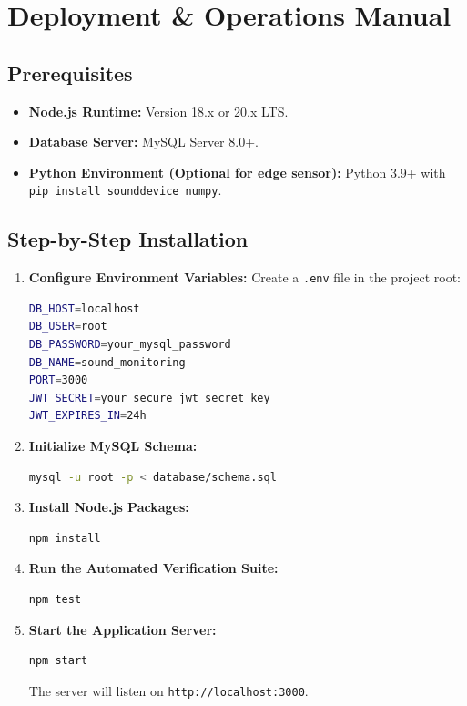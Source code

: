 \documentclass[11pt,a4paper]{article}
\begin{document}
\section{Deployment \& Operations Manual}

\subsection{Prerequisites}
\begin{itemize}[leftmargin=*]
    \item \textbf{Node.js Runtime:} Version 18.x or 20.x LTS.
    \item \textbf{Database Server:} MySQL Server 8.0+.
    \item \textbf{Python Environment (Optional for edge sensor):} Python 3.9+ with \texttt{pip install sounddevice numpy}.
\end{itemize}

\subsection{Step-by-Step Installation}
\begin{enumerate}[leftmargin=*]
    \item \textbf{Configure Environment Variables:} Create a \texttt{.env} file in the project root:
\begin{lstlisting}[language=bash]
DB_HOST=localhost
DB_USER=root
DB_PASSWORD=your_mysql_password
DB_NAME=sound_monitoring
PORT=3000
JWT_SECRET=your_secure_jwt_secret_key
JWT_EXPIRES_IN=24h
\end{lstlisting}

    \item \textbf{Initialize MySQL Schema:}
\begin{lstlisting}[language=bash]
mysql -u root -p < database/schema.sql
\end{lstlisting}

    \item \textbf{Install Node.js Packages:}
\begin{lstlisting}[language=bash]
npm install
\end{lstlisting}

    \item \textbf{Run the Automated Verification Suite:}
\begin{lstlisting}[language=bash]
npm test
\end{lstlisting}

    \item \textbf{Start the Application Server:}
\begin{lstlisting}[language=bash]
npm start
\end{lstlisting}
    The server will listen on \texttt{http://localhost:3000}.
\end{enumerate}
\end{document}
